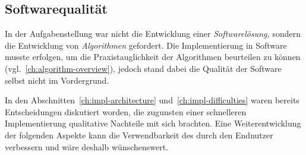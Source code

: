\documentclass[../main/thesis.tex]{subfiles}
\begin{document}
\subsection{Softwarequalität}
\label{ch:improvements-software}

In der Aufgabenstellung war nicht die Entwicklung einer \emph{Softwarelösung,} sondern die Entwicklung von \emph{Algorithmen} gefordert.
Die Implementierung in Software musste erfolgen, um die Praxistauglichkeit der Algorithmen beurteilen zu können (vgl.~\ref{ch:algorithm-overview}), jedoch stand dabei die Qualität der Software selbst nicht im Vordergrund.

In den Abschnitten~\ref{ch:impl-architecture} und~\ref{ch:impl-difficulties} waren bereits Entscheidungen diskutiert worden, die zugunsten einer schnelleren Implementierung qualitative Nachteile mit sich brachten.
Eine Weiterentwicklung der folgenden Aspekte kann die Verwendbarkeit des  durch den Endnutzer verbessern und wäre deshalb wünschenswert.
%
\end{document}
